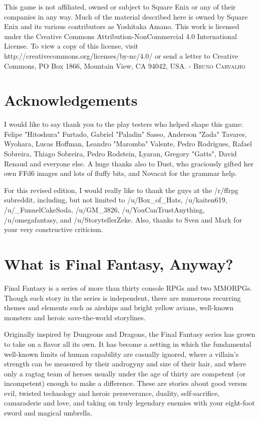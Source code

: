 \begin{multicols}{2}
This game is not affiliated, owned or subject
to Square Enix or any of their companies in any
way. Much of the material described here is owned
by Square Enix and its various contributors as
Yoshitaka Amano. This work is licensed under the
Creative Commons Attribution-NonCommercial
4.0 International License. To view a copy of this
license, visit
http://creativecommons.org/licenses/by-nc/4.0/
or send a letter to Creative Commons, PO Box 1866,
Mountain View, CA 94042, USA.
 - \ferrum\textsc{Bruno Carvalho}\ferrum
\end{multicols}
\newpage

\begin{multicols}{2}
\section*{Acknowledgements}
I would like to say thank you to the play
testers who helped shape this game: Felipe
"Hitoshura" Furtado, Gabriel "Paladin" Sasso,
Anderson "Zada" Tavares, Wyohara, Lucas
Hoffman, Leandro "Maromba" Valente, Pedro
Rodrigues, Rafael Sobreira, Thiago Sobreira, Pedro
Rodstein, Lyaran, Gregory "Gatts", David Renaud
and everyone else. A huge thanks also to Dust,
who graciously gifted her own FFd6 images and
lots of fluffy bits, and Novacat for the grammar
help.

For this revised edition, I would really like
to thank the guys at the /r/ffrpg subreddit,
including, but not limited to /u/Box\_of\_Hats,
/u/kaiten619, /u/\_FunnelCakeSoda, /u/GM\_3826,
/u/YouCanTrustAnything, /u/omegafantasy, and
/u/StorytellerZeke. Also, thanks to Sven and Mark
for your very constructive criticism.

\section*{What is Final Fantasy, Anyway?}
Final Fantasy is a series of more than thirty
console RPGs and two MMORPGs. Though each
story in the series is independent, there are
numerous recurring themes and elements such as
airships and bright yellow avians, well-known
monsters and heroic save-the-world storylines.

Originally inspired by Dungeons and
Dragons, the Final Fantasy series has grown to
take on a flavor all its own. It has become a setting
in which the fundamental well-known limits of
human capability are casually ignored, where a
villain’s strength can be measured by their
androgyny and size of their hair, and where only a
ragtag team of heroes usually under the age of
thirty are competent (or incompetent) enough to
make a difference. These are stories about good
versus evil, twisted technology and heroic
perseverance, duality, self-sacrifice, camaraderie
and love, and taking on truly legendary enemies
with your eight-foot sword and magical umbrella.
\end{multicols}